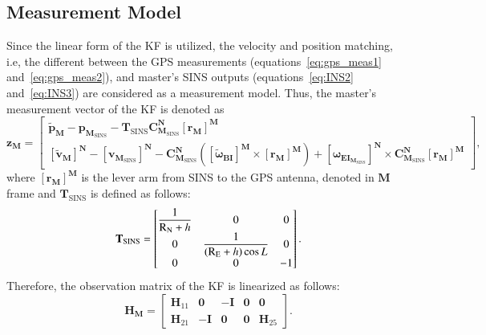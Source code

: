 \documentclass[3p]{elsarticle}
\begin{document}
\subsection{Measurement Model}
\noindent Since the linear form of the KF is utilized, the velocity and position matching, i.e, the different between the GPS measurements (equations~\eqref{eq:gps_meas1} and~\eqref{eq:gps_meas2}), and master's SINS outputs (equations~\eqref{eq:INS2} and~\eqref{eq:INS3})
are considered as a measurement model.
Thus, the master's measurement vector of the KF is denoted as
\begin{equation}\label{meas_vec}
\mathbf{z}_{\mathbf{M}} = \begin{bmatrix}
		{\tilde{\mathbf{p}}}_{\mathbf{M}} - {\mathbf{p}}_{\mathbf{M}_{\text{SINS}}} - {\mathbf{T}_{\text{SINS}}}{\mathbf{ C}}_{\mathbf{M}_{\text{SINS}}}^{\mathbf{N}} {\left[{{\mathbf{r}}_{\mathbf{M}}}\right]}^{\mathbf{M}} \\[1em]
		{\left[\tilde{\mathbf{v}}_{\mathbf{M}}\right]}^{\mathbf{N}} - {\left[{{\mathbf{v}}_{\mathbf{M}_{\text{SINS}}}}\right]}^{\mathbf{N}} - {\mathbf{ C}}_{\mathbf{M}_{\text{SINS}}}^{\mathbf{N}} \left( {\left[{\boldsymbol{\tilde \omega }}_{{\mathbf{BI}}}\right]}^{\mathbf{M}} \times {\left[{{\mathbf{r}}_{\mathbf{M}}}\right]}^{\mathbf{M}} \right) + {\left[{\boldsymbol{ \omega }}_{{\mathbf{EI}}_{\mathbf{M}_{\text{SINS}}}}\right]}^{\mathbf{N}} \times {\mathbf{ C}}_{\mathbf{M}_{\text{SINS}}}^{\mathbf{N}} {\left[{{\mathbf{r}}_{\mathbf{M}}}\right]}^{\mathbf{M}}
	\end{bmatrix},
\end{equation}
where \({\left[{{\mathbf{r}}_{\mathbf{M}}}\right]}^{\mathbf{M}}\) is the lever arm from SINS to the GPS antenna, denoted in \({\mathbf{M}}\) frame and \({\mathbf{T}_{\text{SINS}}}\) is defined as follows:
\begin{equation}
	{\mathbf{T}}_{\text{SINS}} = \begin{bmatrix}
		\dfrac{1}{{{{\rm{R}}_{\rm{N}}} +  h}} & 0 & 0 \\
		0 & \dfrac{1}{{({{\rm{R}}_{\rm{E}}} +  h)\cos  L}} & 0 \\
		0 & 0 & -1
	\end{bmatrix}.
\end{equation}
Therefore, the observation matrix of the KF is linearized as follows:
\begin{equation}\label{H_model}
	{{\mathbf{H}}}_{\mathbf{M}} = \begin{bmatrix}
		{{{\mathbf{H}}_{11}}} & {{\mathbf{0}}} & { - {{\mathbf{I}}}} & {{\mathbf{0}}} & {{\mathbf{0}}} \\
		{{{\mathbf{H}}_{21}}} & { - {{\mathbf{I}}}} & {{\mathbf{0}}} & {{\mathbf{0}}} & {{{\mathbf{H}}_{25}}}
	\end{bmatrix}.
\end{equation}
\end{document}
